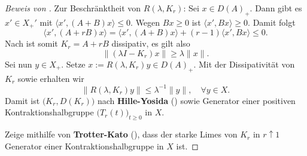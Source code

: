 \begin{proof}[Beweis von ]
\par 
Zur Beschränktheit von $R(\lambda,K_r)$: Sei $x\in D(A)_+$. %
Dann gibt es $x'\in X_+'$ mit $\langle x', (A+B)x\rangle\leq 0$. Wegen $Bx\geq0$ ist $\langle x', Bx\rangle \geq0$. Damit folgt
\begin{equation*}
\langle x', (A+rB)x\rangle = \langle x', (A+B)x\rangle + (r-1)\langle x', Bx\rangle \leq  0.
\end{equation*}
Nach  ist somit $K_r=A+rB$ dissipativ, es gilt also
\begin{equation*}
\|(\lambda I - K_r)x\|\geq \lambda \|x\|.
\end{equation*}
Sei nun $y\in X_+$. Setze $x:=R(\lambda, K_r)y\in D(A)_+$. Mit der  Dissipativität von $K_r$ sowie  erhalten wir
\begin{equation*}\label{Resolvente von K_r ist relativ beschränkt}
\|R(\lambda, K_r)y\|\leq \lambda^{-1}\|y\|,\quad\forall y\in X.
\end{equation*}
Damit ist  $\big(K_r, D(K_r)\big)$ nach \textbf{Hille-Yosida} () sowie  Generator einer positiven Kontraktionshalbgruppe $\big(T_r(t)\big)_{t\geq0}$ in $X$.



\par
Zeige mithilfe von \textbf{Trotter-Kato} (), dass der starke Limes von $K_r$ in $r\uparrow 1$ Generator einer Kontraktionshalbgruppe in $X$ ist.


\end{proof}
